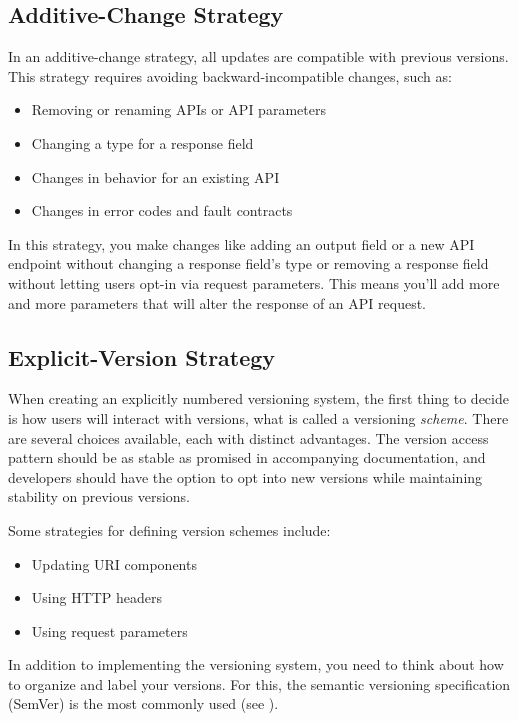 \documentclass{article}
\begin{document}
\subsection{Additive-Change Strategy}

In an additive-change strategy, all updates are compatible with previous versions. This strategy requires avoiding backward-incompatible changes, such as:

\begin{itemize}
    \item Removing or renaming APIs or API parameters
    \item Changing a type for a response field
    \item Changes in behavior for an existing API
    \item Changes in error codes and fault contracts
\end{itemize}

In this strategy, you make changes like adding an output field or a new API endpoint without changing a response field's type or removing a response field without letting users opt-in via request parameters. This means you'll add more and more parameters that will alter the response of an API request.

\subsection{Explicit-Version Strategy}

When creating an explicitly numbered versioning system, the first thing to decide is how users will interact with versions, what is called a versioning \textit{scheme}. There are several choices available, each with distinct advantages. The version access pattern should be as stable as promised in accompanying documentation, and developers should have the option to opt into new versions while maintaining stability on previous versions.

Some strategies for defining version schemes include:

\begin{itemize}
    \item Updating URI components
    \item Using HTTP headers
    \item Using request parameters
\end{itemize}

In addition to implementing the versioning system, you need to think about how to organize and label your versions. For this, the semantic versioning specification (SemVer) is the most commonly used (see \cite{serboutEmpiricalStudyWeb2023a}).
\end{document}
